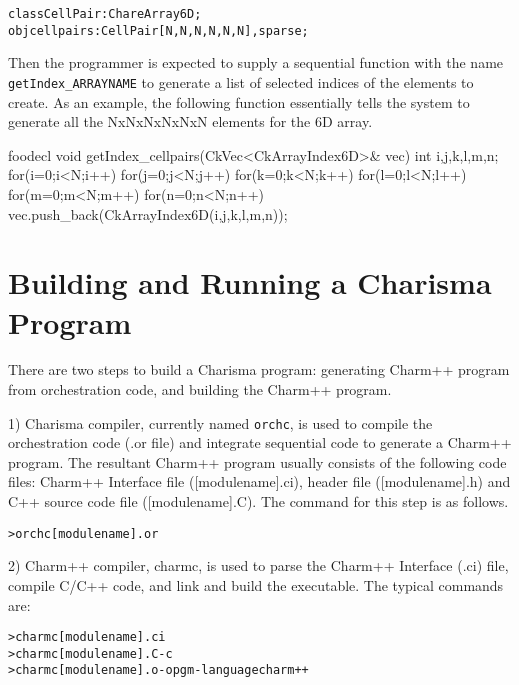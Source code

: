 \documentclass[10pt]{article}
\def\smallfbox#1{{\small {\fbox{#1}}}}
\def\code#1{{\small {\tt {#1}}}}
\begin{document}
\begin{alltt}
    class CellPair : ChareArray6D;	
    obj cellpairs : CellPair[N,N,N,N,N,N],sparse; 
\end{alltt}

Then the programmer is expected to supply a sequential function with the name
\code{getIndex\_ARRAYNAME} to generate a list of selected indices of the
elements to create. As an example, the following function essentially tells the
system to generate all the NxNxNxNxNxN elements for the 6D array. 

\begin{SaveVerbatim}{foodecl}
void getIndex_cellpairs(CkVec<CkArrayIndex6D>& vec){
  int i,j,k,l,m,n;
  for(i=0;i<N;i++)
    for(j=0;j<N;j++)
      for(k=0;k<N;k++)
        for(l=0;l<N;l++)
          for(m=0;m<N;m++)
            for(n=0;n<N;n++)
              vec.push_back(CkArrayIndex6D(i,j,k,l,m,n));
}
\end{SaveVerbatim}
\vspace{0.1in}
\smallfbox{\BUseVerbatim{foodecl}}
\vspace{0.1in}


\section{Building and Running a Charisma Program}
There are two steps to build a Charisma program: generating Charm++ program 
from orchestration code, and building the Charm++ program. 

1) Charisma compiler, currently named \code{orchc}, is used to compile the
orchestration code (.or file) and integrate sequential code to generate a
Charm++ program. The resultant Charm++ program usually consists of the 
following code files: Charm++ Interface file ([modulename].ci), header file 
([modulename].h) and C++ source code file ([modulename].C). The command 
for this step is as follows.

\begin{alltt}
    > orchc [modulename].or
\end{alltt}

2) Charm++ compiler, charmc, is used to parse the Charm++ Interface (.ci) file,
compile C/C++ code, and link and build the executable. The typical commands are:
\begin{alltt}
    > charmc [modulename].ci
    > charmc [modulename].C -c
    > charmc [modulename].o -o pgm -language charm++
\end{alltt}
\end{document}
